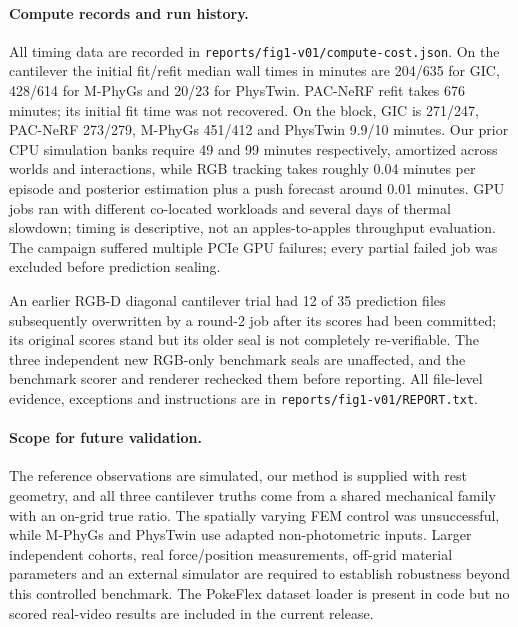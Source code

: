 \paragraph{Compute records and run history.}
All timing data are recorded in \texttt{reports/fig1-v01/compute-cost.json}. On the cantilever the initial fit/refit median wall times in minutes are 204/635 for GIC, 428/614 for M-PhyGs and 20/23 for PhysTwin. PAC-NeRF refit takes 676 minutes; its initial fit time was not recovered. On the block, GIC is 271/247, PAC-NeRF 273/279, M-PhyGs 451/412 and PhysTwin 9.9/10 minutes. Our prior CPU simulation banks require 49 and 99 minutes respectively, amortized across worlds and interactions, while RGB tracking takes roughly 0.04 minutes per episode and posterior estimation plus a push forecast around 0.01 minutes. GPU jobs ran with different co-located workloads and several days of thermal slowdown; timing is descriptive, not an apples-to-apples throughput evaluation. The campaign suffered multiple PCIe GPU failures; every partial failed job was excluded before prediction sealing.

An earlier RGB-D diagonal cantilever trial had 12 of 35 prediction files subsequently overwritten by a round-2 job after its scores had been committed; its original scores stand but its older seal is not completely re-verifiable. The three independent new RGB-only benchmark seals are unaffected, and the benchmark scorer and renderer rechecked them before reporting. All file-level evidence, exceptions and instructions are in \texttt{reports/fig1-v01/REPORT.txt}.

\paragraph{Scope for future validation.}
The reference observations are simulated, our method is supplied with rest geometry, and all three cantilever truths come from a shared mechanical family with an on-grid true ratio. The spatially varying FEM control was unsuccessful, while M-PhyGs and PhysTwin use adapted non-photometric inputs. Larger independent cohorts, real force/position measurements, off-grid material parameters and an external simulator are required to establish robustness beyond this controlled benchmark. The PokeFlex dataset loader is present in code but no scored real-video results are included in the current release.
